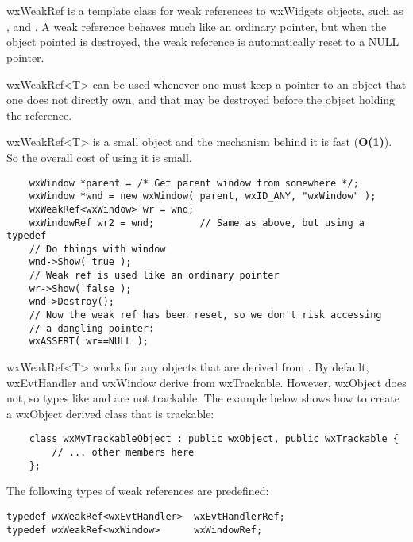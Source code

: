 \section{}\label{wxweakref}

wxWeakRef is a template class for weak references to wxWidgets objects, 
such as ,  and 
. A weak reference behaves much like an ordinary
pointer, but when the object pointed is destroyed, the weak reference is
automatically reset to a NULL pointer. 

wxWeakRef<T> can be used whenever one must keep a pointer to an object 
that one does not directly own, and that may be destroyed before the object
holding the reference. 

wxWeakRef<T> is a small object and the mechanism behind it is fast 
(\textbf{O(1)}). So the overall cost of using it is small. 



\begin{verbatim}
    wxWindow *parent = /* Get parent window from somewhere */;
    wxWindow *wnd = new wxWindow( parent, wxID_ANY, "wxWindow" );
    wxWeakRef<wxWindow> wr = wnd;  
    wxWindowRef wr2 = wnd;        // Same as above, but using a typedef
    // Do things with window
    wnd->Show( true );
    // Weak ref is used like an ordinary pointer 
    wr->Show( false );
    wnd->Destroy(); 
    // Now the weak ref has been reset, so we don't risk accessing
    // a dangling pointer:
    wxASSERT( wr==NULL );
\end{verbatim}

wxWeakRef<T> works for any objects that are derived from .
By default, wxEvtHandler and wxWindow derive from wxTrackable. However, 
wxObject does not, so types like  and 
 are not trackable. The example below shows how to
create a wxObject derived class that is trackable: 

\begin{verbatim}
    class wxMyTrackableObject : public wxObject, public wxTrackable { 
        // ... other members here 
    }; 
\end{verbatim}


The following types of weak references are predefined: 

\begin{verbatim}
typedef wxWeakRef<wxEvtHandler>  wxEvtHandlerRef;
typedef wxWeakRef<wxWindow>      wxWindowRef;
\end{verbatim}


